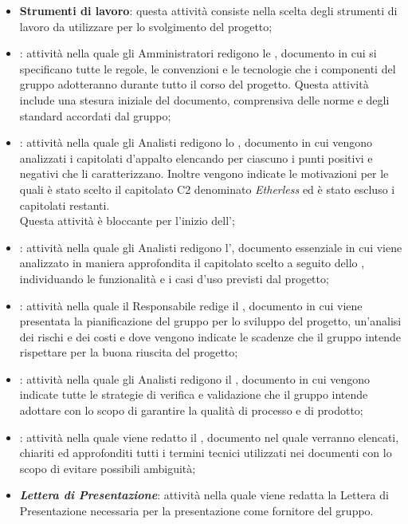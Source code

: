 \begin{itemize}
	\item \textbf{Strumenti di lavoro}: questa attività consiste nella scelta degli strumenti di lavoro da utilizzare per lo svolgimento del progetto;
	\item \textbf{\textit{\NdP{}}}: attività nella quale gli Amministratori redigono le \NdP{}, documento in cui si specificano tutte le regole, le convenzioni e le tecnologie che i componenti del gruppo adotteranno durante tutto il corso del progetto. Questa attività include una stesura iniziale del documento, comprensiva delle norme e degli standard accordati dal gruppo;
	\item \textbf{\textit{\SdF{}}}: attività nella quale gli Analisti redigono lo \SdF, documento in cui vengono analizzati i capitolati d'appalto elencando per ciascuno i punti positivi e negativi che li caratterizzano. Inoltre vengono indicate le motivazioni per le quali è stato scelto il capitolato C2 denominato \textit{Etherless} ed è stato escluso i capitolati restanti. \\
	Questa attività è bloccante per l'inizio dell'\AdR{};
	\item \textbf{\textit{\AdR{}}}: attività nella quale gli Analisti redigono l'\AdR, documento essenziale in cui viene analizzato in maniera approfondita il capitolato scelto a seguito dello \SdF{}, individuando le funzionalità e i casi d'uso previsti dal progetto;
	\item \textbf{\textit{\PdP{}}}: attività nella quale il Responsabile redige il \PdP, documento in cui viene presentata la pianificazione del gruppo per lo sviluppo del progetto, un'analisi dei rischi e dei costi e dove vengono indicate le scadenze che il gruppo intende rispettare per la buona riuscita del progetto;
	\item \textbf{\textit{\PdQ{}}}: attività nella quale gli Analisti redigono il \PdQ, documento in cui vengono indicate tutte le strategie di verifica e validazione che il gruppo intende adottare con lo scopo di garantire la qualità di processo e di prodotto;
	\item \textbf{\textit{\Glossario{}}}: attività nella quale viene redatto il \Glossario, documento nel quale verranno elencati, chiariti ed approfonditi tutti i termini tecnici utilizzati nei documenti con lo scopo di evitare possibili ambiguità;
	\item \textbf{\textit{Lettera di Presentazione}}: attività nella quale viene redatta la Lettera di Presentazione necessaria per la presentazione come fornitore del gruppo.
\end{itemize}
